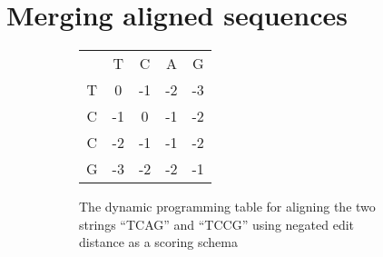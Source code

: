 \documentclass[thesis.tex]{subfiles}
\begin{document}
\section{Merging aligned sequences}
\begin{wrapfigure}{r}{0.5\textwidth}
  \begin{mdframed}
    \begin{subfigure}[t]{\textwidth}
      \begin{mdframed}
        \begin{center}
          \begin{tabularx}{\linewidth}{ccccc}
            & T & C & A & G \\ \cline{2-5}
            T & \multicolumn{1}{|c|}{0} & -1 & \multicolumn{1}{|c|}{-2} & \multicolumn{1}{c|}{-3} \\ \cline{2-5}
            C & \multicolumn{1}{|c|}{-1} & 0 & \multicolumn{1}{|c|}{-1} & \multicolumn{1}{c|}{-2} \\ \cline{2-5}
            C & \multicolumn{1}{|c|}{-2} & -1 & \multicolumn{1}{|c|}{-1} & \multicolumn{1}{c|}{-2} \\ \cline{2-5}
            G & \multicolumn{1}{|c|}{-3} & -2 & \multicolumn{1}{|c|}{-2} & \multicolumn{1}{c|}{-1} \\ \cline{2-5}
          \end{tabularx}
        \end{center}
      \end{mdframed}
      \caption{The dynamic programming table for aligning the two strings ``TCAG'' and ``TCCG'' using negated edit distance as a scoring schema}
    \end{subfigure}
    \begin{subfigure}[t]{\textwidth}
      \begin{mdframed}
        \begin{center}
\end{center}
\end{mdframed}
\end{subfigure}
\end{mdframed}
\end{wrapfigure}
\end{document}
